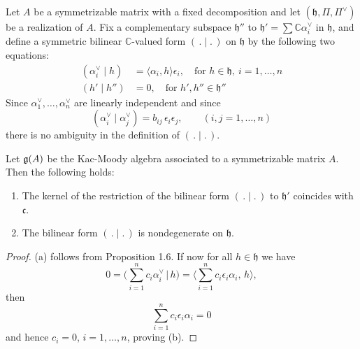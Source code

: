 \documentclass[12pt]{article}
\begin{document}
Let $A$ be a symmetrizable matrix with a fixed decomposition and let $(\mathfrak{h}, \Pi, \Pi^\vee)$ be a realization of $A$. Fix a complementary subspace $\mathfrak{h}''$ to $\mathfrak{h}' = \sum \mathbb{C}\alpha_i^\vee$ in $\mathfrak{h}$, and define a symmetric bilinear $\mathbb{C}$-valued form $(\,.\mid.\,)$ on $\mathfrak{h}$ by the following two equations:
\begin{align}\label{form-on-h}
    (\alpha_i^\vee \mid h) & = \langle \alpha_i, h \rangle \epsilon_i, \quad \text{for } h \in \mathfrak{h},\ i = 1,\ldots,n \\
    (h' \mid h'')          & = 0, \quad \text{for } h', h'' \in \mathfrak{h}''
\end{align}
Since $\alpha_1^\vee, \ldots, \alpha_n^\vee$ are linearly independent and since \begin{equation}
    (\alpha_i^\vee \mid \alpha_j^\vee) = b_{ij}\,\epsilon_i\epsilon_j,
    \qquad (i,j=1,\ldots,n)
\end{equation}
there is no ambiguity in the definition of $(\,.\mid.\,)$.

\begin{lemma}\label{lem:bilinear-form-nondeg}
    Let $\mathfrak{g}(A)$ be the Kac-Moody algebra associated to a symmetrizable matrix $A$. Then the following holds:
    \begin{enumerate}
        \item The kernel of the restriction of the bilinear form $(\,.\mid.\,)$ to $\mathfrak{h}'$
              coincides with $\mathfrak{c}$.
        \item The bilinear form $(\,.\mid.\,)$ is nondegenerate on $\mathfrak{h}$.
    \end{enumerate}
\end{lemma}

\begin{proof}
    (a) follows from Proposition 1.6.
    If now for all $h \in \mathfrak{h}$ we have
    \[
        0 = \Big(\sum_{i=1}^n c_i \alpha_i^\vee \,\Big|\, h\Big)
        = \Big\langle \sum_{i=1}^n c_i \epsilon_i \alpha_i,\, h \Big\rangle,
    \]
    then
    \[
        \sum_{i=1}^n c_i \epsilon_i \alpha_i = 0
    \]
    and hence $c_i = 0$, $i=1,\ldots,n$, proving (b).
\end{proof}
\end{document}
